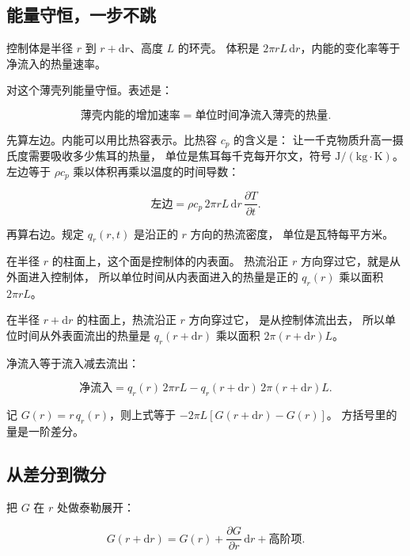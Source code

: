 \subsection{能量守恒，一步不跳}

控制体是半径 $r$ 到 $r+\mathrm{d}r$、高度 $L$ 的环壳。
体积是 $2\pi r L\,\mathrm{d}r$，内能的变化率等于净流入的热量速率。

对这个薄壳列能量守恒。表述是：

\begin{equation}
\text{薄壳内能的增加速率} = \text{单位时间净流入薄壳的热量}.
\end{equation}

先算左边。内能可以用比热容表示。比热容 $c_p$ 的含义是：
让一千克物质升高一摄氏度需要吸收多少焦耳的热量，
单位是焦耳每千克每开尔文，符号 $\mathrm{J/(kg\cdot K)}$。
左边等于 $\rho c_p$ 乘以体积再乘以温度的时间导数：

\begin{equation}
\text{左边} = \rho c_p\,2\pi r L\,\mathrm{d}r\,\frac{\partial T}{\partial t}.
\label{eq:lhs2}
\end{equation}

再算右边。规定 $q_r(r,t)$ 是沿正的 $r$ 方向的热流密度，
单位是瓦特每平方米。

在半径 $r$ 的柱面上，这个面是控制体的内表面。
热流沿正 $r$ 方向穿过它，就是从外面进入控制体，
所以单位时间从内表面进入的热量是正的 $q_r(r)$ 乘以面积 $2\pi rL$。

在半径 $r+\mathrm{d}r$ 的柱面上，热流沿正 $r$ 方向穿过它，
是从控制体流出去，
所以单位时间从外表面流出的热量是 $q_r(r+\mathrm{d}r)$
乘以面积 $2\pi(r+\mathrm{d}r)L$。

净流入等于流入减去流出：

\begin{equation}
\text{净流入} = q_r(r)\,2\pi r L - q_r(r+\mathrm{d}r)\,2\pi(r+\mathrm{d}r)L .
\label{eq:rhs}
\end{equation}

记 $G(r)=r\,q_r(r)$，则上式等于 $-2\pi L\left[G(r+\mathrm{d}r)-G(r)\right]$。
方括号里的量是一阶差分。

\subsection{从差分到微分}

把 $G$ 在 $r$ 处做泰勒展开：

\begin{equation}
G(r+\mathrm{d}r) = G(r) + \frac{\partial G}{\partial r}\,\mathrm{d}r + \text{高阶项}.
\end{equation}

